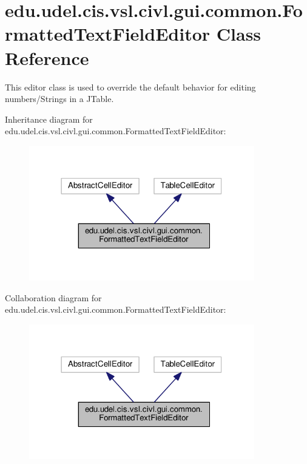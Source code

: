 \hypertarget{classedu_1_1udel_1_1cis_1_1vsl_1_1civl_1_1gui_1_1common_1_1FormattedTextFieldEditor}{}\section{edu.\+udel.\+cis.\+vsl.\+civl.\+gui.\+common.\+Formatted\+Text\+Field\+Editor Class Reference}
\label{classedu_1_1udel_1_1cis_1_1vsl_1_1civl_1_1gui_1_1common_1_1FormattedTextFieldEditor}


This editor class is used to override the default behavior for editing numbers/\+Strings in a J\+Table.  




Inheritance diagram for edu.\+udel.\+cis.\+vsl.\+civl.\+gui.\+common.\+Formatted\+Text\+Field\+Editor\+:
\nopagebreak
\begin{figure}[H]
\begin{center}
\leavevmode
\includegraphics[width=278pt]{classedu_1_1udel_1_1cis_1_1vsl_1_1civl_1_1gui_1_1common_1_1FormattedTextFieldEditor__inherit__graph}
\end{center}
\end{figure}


Collaboration diagram for edu.\+udel.\+cis.\+vsl.\+civl.\+gui.\+common.\+Formatted\+Text\+Field\+Editor\+:
\nopagebreak
\begin{figure}[H]
\begin{center}
\leavevmode
\includegraphics[width=278pt]{classedu_1_1udel_1_1cis_1_1vsl_1_1civl_1_1gui_1_1common_1_1FormattedTextFieldEditor__coll__graph}
\end{center}
\end{figure}
